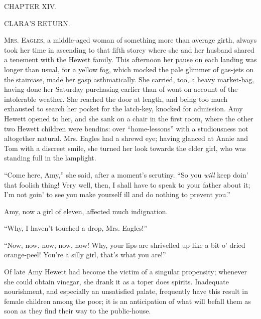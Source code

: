 {}

{CHAPTER XIV.}

CLARA'S RETURN.

\textsc{Mrs. Eagles}, a middle-aged woman of something more than average
girth, always took her time in ascending to that fifth storey where she
and her husband shared a tenement with the Hewett family. This afternoon
her pause on each landing was longer than usual, for a yellow fog, which
mocked the pale glimmer of gas-jets on the staircase, made her gasp
asthmatically. She carried, too, a heavy market-bag, having done her
Saturday purchasing earlier than of wont on account of the intolerable
weather. She reached the door at length, and being too much exhausted to
search her pocket for the latch-key, knocked for admission. Amy Hewett
opened to her, and she sank on a chair in the first room, where the
other two Hewett children were bendins: over ``home-lessons'' with a
{}studiousness not altogether natural. Mrs. Eagles had a shrewd eye;
having glanced at Annie and Tom with a discreet smile, she turned her
look towards the elder girl, who was standing full in the lamplight.

``Come here, Amy,'' she said, after a moment's scrutiny. ``So you
\emph{will} keep doin' that foolish thing! Very well, then, I shall have
to speak to your father about it; I'm not goin' to see you make yourself
ill and do nothing to prevent you.''

Amy, now a girl of eleven, affected much indignation.

``Why, I haven't touched a drop, Mrs. Eagles!''

``Now, now, now, now, now! Why, your lips are shrivelled up like a bit
o' dried orange-peel! You're a silly girl, that's what you are!''

Of late Amy Hewett had become the victim of a singular propensity;
whenever she could obtain vinegar, she drank it as a toper does spirits.
Inadequate nourishment, and especially an unsatisfied palate, frequently
have this result in female children among the poor; {}it is an
anticipation of what will befall them as soon as they find their way to
the public-house.

